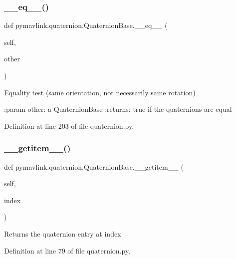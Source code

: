 \subsubsection{\texorpdfstring{\_\_eq\_\_()}{\_\_eq\_\_()}}
{\footnotesize\ttfamily def pymavlink.\+quaternion.\+Quaternion\+Base.\+\_\+\+\_\+eq\+\_\+\+\_\+ (\begin{DoxyParamCaption}\item[{}]{self,  }\item[{}]{other }\end{DoxyParamCaption})}

\begin{DoxyVerb}Equality test (same orientation, not necessarily same rotation)

:param other: a QuaternionBase
:returns: true if the quaternions are equal
\end{DoxyVerb}
 

Definition at line 203 of file quaternion.\+py.

\mbox{\label{classpymavlink_1_1quaternion_1_1QuaternionBase_a2877818e54a5c9bc1a39caf4ce0fddf5}} 
\subsubsection{\texorpdfstring{\_\_getitem\_\_()}{\_\_getitem\_\_()}}
{\footnotesize\ttfamily def pymavlink.\+quaternion.\+Quaternion\+Base.\+\_\+\+\_\+getitem\+\_\+\+\_\+ (\begin{DoxyParamCaption}\item[{}]{self,  }\item[{}]{index }\end{DoxyParamCaption})}

\begin{DoxyVerb}Returns the quaternion entry at index\end{DoxyVerb}
 

Definition at line 79 of file quaternion.\+py.

\mbox{\label{classpymavlink_1_1quaternion_1_1QuaternionBase_a694593af9f5007fc418b1473c3b32496}} 
